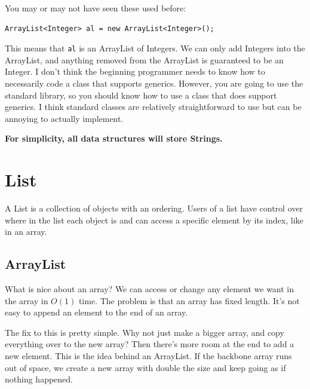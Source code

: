 \documentclass[11pt]{book}
\begin{document}
You may or may not have seen these used before:
\begin{verbatim}
ArrayList<Integer> al = new ArrayList<Integer>();
\end{verbatim}
This means that \texttt{al} is an ArrayList of Integers. We can only add Integers into the ArrayList, and anything removed from the ArrayList is guaranteed to be an Integer. I don't think the beginning programmer needs to know how to necessarily code a class that supports generics. However, you are going to use the standard library, so you should know how to use a class that does support generics. I think standard classes are relatively straightforward to use but can be annoying to actually implement.

\textbf{For simplicity, all data structures will store Strings.}

\section{List}

A List is a collection of objects with an ordering. Users of a list have control over where in the list each object is and can access a specific element by its index, like in an array.

\subsection{ArrayList}

What is nice about an array? We can access or change any element we want in the array in $O(1)$ time. The problem is that an array has fixed length. It's not easy to append an element to the end of an array.

The fix to this is pretty simple. Why not just make a bigger array, and copy everything over to the new array? Then there's more room at the end to add a new element. This is the idea behind an ArrayList. If the backbone array runs out of space, we create a new array with double the size and keep going as if nothing happened.
\end{document}
